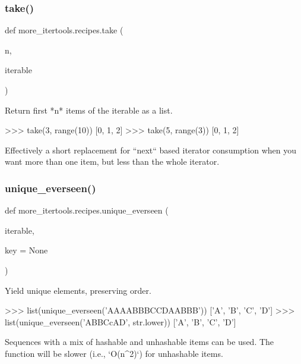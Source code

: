 \subsubsection{\texorpdfstring{take()}{take()}}
{\footnotesize\ttfamily def more\+\_\+itertools.\+recipes.\+take (\begin{DoxyParamCaption}\item[{}]{n,  }\item[{}]{iterable }\end{DoxyParamCaption})}

\begin{DoxyVerb}Return first *n* items of the iterable as a list.

    >>> take(3, range(10))
    [0, 1, 2]
    >>> take(5, range(3))
    [0, 1, 2]

Effectively a short replacement for ``next`` based iterator consumption
when you want more than one item, but less than the whole iterator.\end{DoxyVerb}
 \mbox{\label{namespacemore__itertools_1_1recipes_ae04c0e99048d06439e3225bf9e931c94}} 
\subsubsection{\texorpdfstring{unique\+\_\+everseen()}{unique\_everseen()}}
{\footnotesize\ttfamily def more\+\_\+itertools.\+recipes.\+unique\+\_\+everseen (\begin{DoxyParamCaption}\item[{}]{iterable,  }\item[{}]{key = {\ttfamily None} }\end{DoxyParamCaption})}

\begin{DoxyVerb}Yield unique elements, preserving order.

    >>> list(unique_everseen('AAAABBBCCDAABBB'))
    ['A', 'B', 'C', 'D']
    >>> list(unique_everseen('ABBCcAD', str.lower))
    ['A', 'B', 'C', 'D']

Sequences with a mix of hashable and unhashable items can be used.
The function will be slower (i.e., `O(n^2)`) for unhashable items.\end{DoxyVerb}
 \mbox{\label{namespacemore__itertools_1_1recipes_adfffd7653dc27192b5f9d5cf69531514}} 
